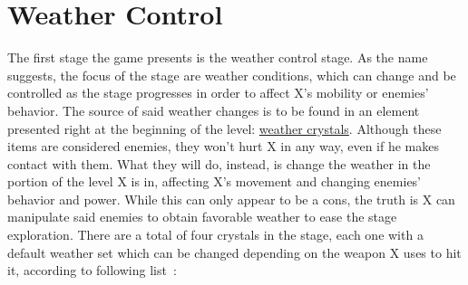 \section{Weather Control}
The first stage the game presents is the weather control stage. As the name suggests, the focus of the stage are weather conditions, which can change and be controlled as the stage progresses in order to affect X's mobility or enemies' behavior. The source of said weather changes is to be found in an element presented right at the beginning of the level: \hyperlink{enem:Weather_crystal}{weather crystals}. Although these items are considered enemies, they won't hurt X in any way, even if he makes contact with them. What they will do, instead, is change the weather in the portion of the level X is in, affecting X's movement and changing enemies' behavior and power. While this can only appear to be a cons, the truth is X can manipulate said enemies to obtain favorable weather to ease the stage exploration. There are a total of four crystals in the stage, each one with a default weather set which can be changed depending on the weapon X uses to hit it, according to following list~\cite{wiki:Weather_crystal}:
